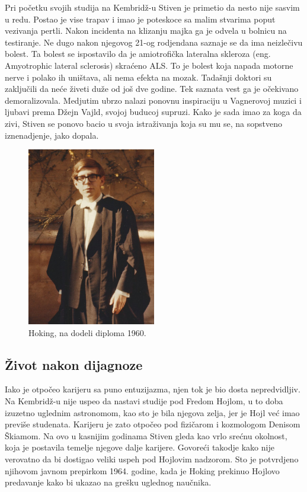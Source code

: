 \documentclass[a4paper, 12pt]{article}
\begin{document}
{Pri početku svojih studija na Kembridž-u Stiven je primetio da nesto nije sasvim u 
redu. Postao je vise trapav i imao je poteskoce sa malim stvarima poput vezivanja 
pertli. Nakon incidenta na klizanju majka ga je odvela u bolnicu na testiranje. Ne 
dugo nakon njegovog 21-og rodjendana saznaje se da ima neizlečivu bolest. Ta bolest 
se ispostavilo da je amiotrofička lateralna skleroza (eng. Amyotrophic lateral 
sclerosis) skraćeno ALS. To je bolest koja napada motorne nerve i polako ih uništava, 
ali nema efekta na mozak. Tadašnji doktori su zaključili da neće živeti duže od još 
dve godine. Tek saznata vest ga je očekivano demoralizovala. Medjutim ubrzo nalazi ponovnu 
inspiraciju u Vagnerovoj muzici i ljubavi prema Džejn Vajld, svojoj buducoj supruzi. 
Kako je sada imao za koga da zivi, Stiven se ponovo bacio u svoja istraživanja koja 
su mu se, na sopstveno iznenadjenje, jako dopala. \cite{hawkingcom}

\begin{figure}[h!]
\centering
\includegraphics[width=0.5\textwidth]{Hoking,PreDijagnoze.jpg}
\caption{Hoking, na dodeli diploma 1960.}
\end{figure}

\subsection{Život nakon dijagnoze}
Iako je otpočeo karijeru sa puno entuzijazma, njen tok je bio dosta nepredvidljiv. 
Na Kembridž-u nije uspeo da nastavi studije pod Fredom Hojlom, u to doba izuzetno 
uglednim astronomom, kao sto je bila njegova zelja, jer je Hojl već imao previše 
studenata. Karijeru je zato otpočeo pod fizičarom i kozmologom Denisom Škiamom. 
Na ovo u kasnijim godinama Stiven gleda kao vrlo srećnu okolnost, koja je postavila 
temelje njegove dalje karijere. Govoreći takodje kako nije verovatno da bi dostigao 
veliki uspeh pod Hojlovim nadzorom. Sto je potvrdjeno njihovom javnom prepirkom 1964. 
godine, kada je Hoking prekinuo Hojlovo predavanje kako bi ukazao na grešku uglednog 
naučnika. \medskip \cite{kratkaistorija}
\newpage

}
\end{document}
